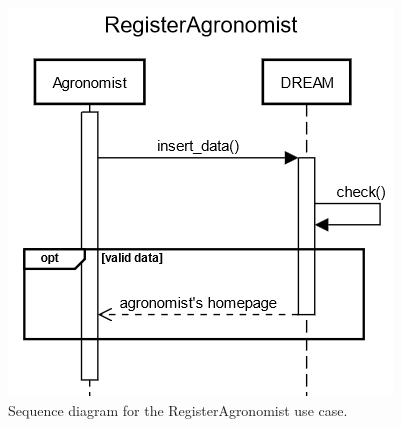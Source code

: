 \documentclass{article}
\begin{document}
\begin{figure}[H]
    \centering
    \includegraphics[scale=0.60]{sequence_diagrams/RegisterAgronomist}
    \caption{Sequence diagram for the RegisterAgronomist use case.}
\end{figure}
\newpage
\end{document}
